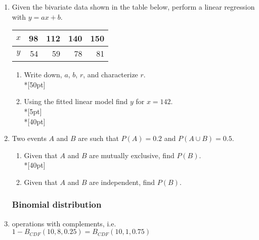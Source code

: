 \documentclass[12pt, oneside]{article}
\begin{document}
\begin{enumerate}
\item Given the bivariate data shown in the table below, perform a linear regression with $y=ax+b$.\\
\begin{tabular}{|c|r|r|r|r|}
\hline 
$x$ & 98 & 112 & 140 & 150\\ 
\hline 
$y$ & 54 & 59 & 78 & 81  \\ 
\hline 
\end{tabular}
\begin{enumerate}
    \item Write down, $a$, $b$, $r$, and characterize $r$.\\*[50pt]
\item Using the fitted linear model find $y$ for $x=142$.\\*[5pt]
\\*[40pt]
\end{enumerate}

\item Two events $A$ and $B$ are such that $P(A)=0.2$ and $P(A \cup B) =0.5$. 
\begin{enumerate}
    \item Given that $A$ and $B$ are mutually exclusive, find $P(B)$.\\*[40pt]
    \item Given that $A$ and $B$ are independent, find $P(B)$.
\end{enumerate}

\newpage
\subsubsection*{Binomial distribution}
\item operations with complements, i.e. $1-B_{CDF}(10,8,0.25)=B_{CDF}(10,1,0.75)$


\end{enumerate}
\end{document}
